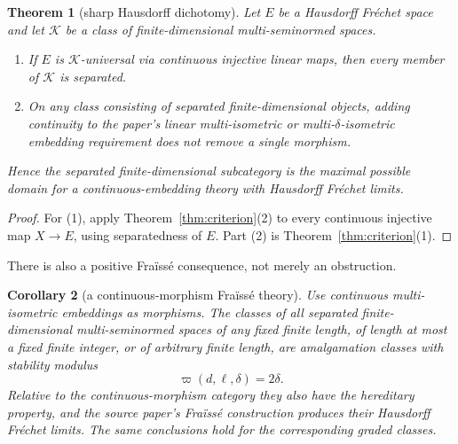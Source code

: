 \documentclass[10pt]{article}
\newtheorem{theorem}{Theorem}
\newtheorem{corollary}[theorem]{Corollary}
\newcommand{\K}{\mathcal K}
\begin{document}
\begin{theorem}[sharp Hausdorff dichotomy]\label{thm:dichotomy}
Let $E$ be a Hausdorff Fr\'echet space and let $\K$ be a class of
finite-dimensional multi-seminormed spaces.
\begin{enumerate}
\item If $E$ is $\K$-universal via continuous injective linear maps, then every
member of $\K$ is separated.
\item On any class consisting of separated finite-dimensional objects, adding
continuity to the paper's linear multi-isometric or multi-$\delta$-isometric
embedding requirement does not remove a single morphism.
\end{enumerate}
Hence the separated finite-dimensional subcategory is the maximal possible
domain for a continuous-embedding theory with Hausdorff Fr\'echet limits.
\end{theorem}

\begin{proof}
For (1), apply Theorem~\ref{thm:criterion}(2) to every continuous injective map
$X\to E$, using separatedness of $E$.  Part (2) is
Theorem~\ref{thm:criterion}(1).
\end{proof}

There is also a positive Fra\"iss\'e consequence, not merely an obstruction.

\begin{corollary}[a continuous-morphism Fra\"iss\'e theory]\label{cor:fraisse}
Use continuous multi-isometric embeddings as morphisms.  The classes of all
separated finite-dimensional multi-seminormed spaces of any fixed finite
length, of length at most a fixed finite integer, or of arbitrary finite
length, are amalgamation classes with stability modulus
\[
                              \varpi(d,\ell,\delta)=2\delta.
\]
Relative to the continuous-morphism category they also have the hereditary
property, and the source paper's Fra\"iss\'e construction produces their
Hausdorff Fr\'echet limits.  The same conclusions hold for the corresponding
graded classes.
\end{corollary}
\end{document}
